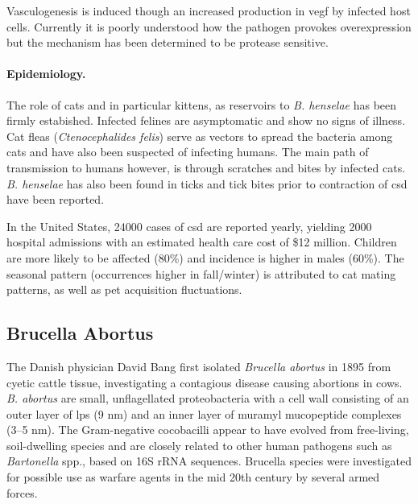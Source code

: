 Vasculogenesis is induced though an increased production in \gls{vegf} by infected host cells. Currently it is poorly understood how the pathogen provokes overexpression but the mechanism has been determined to be protease sensitive.

\paragraph{Epidemiology.}
The role of cats and in particular kittens, as reservoirs to \textit{B. henselae} has been firmly estabished. Infected felines are asymptomatic and show no signs of illness. Cat fleas (\textit{Ctenocephalides felis}) serve as vectors to spread the bacteria among cats and have also been suspected of infecting humans. The main path of transmission to humans however, is through scratches and bites by infected cats. \textit{B. henselae} has also been found in ticks and tick bites prior to contraction of \gls{csd} have been reported.

In the United States, 24000 cases of \gls{csd} are reported yearly, yielding 2000 hospital admissions with an estimated health care cost of \$12 million. Children are more likely to be affected (80\%) and incidence is higher in males (60\%). The seasonal pattern (occurrences higher in fall/winter) is attributed to cat mating patterns, as well as pet acquisition fluctuations.

\subsection{Brucella Abortus}


The Danish physician David Bang first isolated \textit{Brucella abortus} in 1895 from cyetic cattle tissue, investigating a contagious disease causing abortions in cows. \textit{B. abortus} are small, unflagellated proteobacteria with a cell wall consisting of an outer layer of \gls{lps} (9 nm) and an inner layer of muramyl mucopeptide complexes (3--5 nm). The Gram-negative cocobacilli appear to have evolved from free-living, soil-dwelling species and are closely related to other human pathogens such as \textit{Bartonella} spp., based on 16S rRNA sequences. Brucella species were investigated for possible use as warfare agents in the mid 20th century by several armed forces. \citep{Atluri2011}

